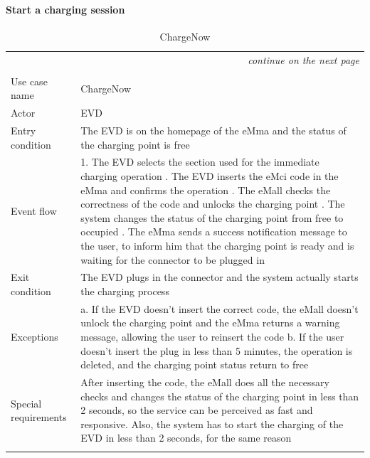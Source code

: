 \paragraph{Start a charging session}
\begin{center}
    \begin{longtable}{p{4cm} p{11cm}}
    \multicolumn{2}{r}{\itshape{continue on the next page}}\\
    \endfoot 
    \\
    \endlastfoot
    \hline
     Use case name &  ChargeNow\\
     \hline
     Actor & EVD \\
     \hline
     Entry condition & The EVD is on the homepage of the eMma and the status of the charging point is free \\
     \hline
     Event flow &   
        1. The EVD selects the section used for the immediate charging operation \newline
        2. The EVD inserts the eMci code in the eMma and confirms the operation \newline
        3. The eMall checks the correctness of the code and unlocks the charging point \newline
        4. The system changes the status of the charging point from free to occupied \newline   
        5. The eMma sends a success notification message to the user, to inform him that the charging point is ready and is waiting for the connector to be plugged in\\
     \hline
     Exit condition &  The EVD plugs in the connector and the system actually starts the charging process \\
     \hline
     Exceptions &   
        a. If the EVD doesn't insert the correct code, the eMall doesn't unlock the charging point and the eMma returns a warning message, allowing the user to reinsert the code\newline
        b. If the user doesn't insert the plug in less than 5 minutes, the operation is deleted, and the charging point status return to free \\ 
     \hline
     Special requirements & After inserting the code, the eMall does all the necessary checks and changes the status of the charging point in less than 2 seconds, so the service can be perceived as fast and responsive. Also, the system has to start the charging of the EVD in less than 2 seconds, for the same reason \\
     \hline
    \caption{ChargeNow}
    \label{tab:ChargeNow}
    \end{longtable}
\end{center}


